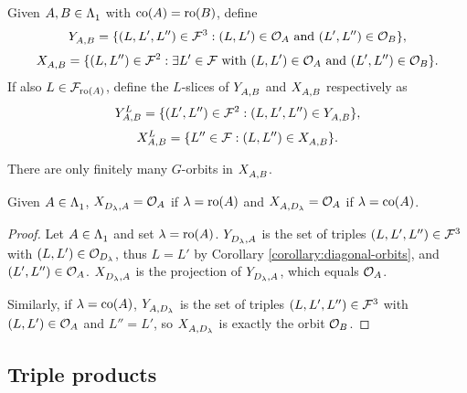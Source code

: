 \documentclass[a4paper, 11pt]{report}
\begin{document}
Given $A,B\in\matrices$ with $\co{A}=\ro{B}$, define
\begin{equation*}
\yprod{A,B} = \{ (L,L',L'')\in\flags^3: (L,L')\in\orbit{A} \text{ and } (L',L'')\in\orbit{B}\},
\end{equation*}
\begin{equation*}
\xprod{A,B} = \{(L,L'')\in\flags^2:\exists L'\in\flags\text{ with } (L,L')\in\orbit{A} \text{ and } (L',L'')\in\orbit{B}\}.
\end{equation*}
If also $L\in\flags_{\ro{A}}$, define the $L$-slices of $\yprod{A,B}$ and $\xprod{A,B}$ respectively as
\begin{equation*}
\yprod[L]{A,B} = \{(L',L'')\in\flags^2: (L,L',L'')\in\yprod{A,B}\},
\end{equation*}
\begin{equation*}
\xprod[L]{A,B} = \{L''\in\flags: (L,L'')\in\xprod{A,B}\}.
\end{equation*}

\begin{observation}
There are only finitely many $G$-orbits in $\xprod{A,B}$.
\end{observation}

\begin{lemma}\label{lemma:product-with-diagonal-orbits}
Given $A\in\matrices$, $\xprod{D_\lambda,A}=\orbit{A}$ if $\lambda=\ro{A}$ and $\xprod{A,D_\lambda}=\orbit{A}$ if $\lambda=\co{A}$.
\end{lemma}

\begin{proof}
Let $A\in\matrices$ and set $\lambda=\ro{A}$. $\yprod{D_\lambda,A}$ is the set of triples $(L,L',L'')\in\flags^3$ with $(L,L')\in\orbit{D_\lambda}$, thus $L=L'$ by Corollary \ref{corollary:diagonal-orbits}, and $(L',L'')\in\orbit{A}$. $\xprod{D_\lambda,A}$ is the projection of $\yprod{D_\lambda,A}$, which equals $\orbit{A}$.

Similarly, if $\lambda=\co{A}$, $\yprod{A,D_\lambda}$ is the set of triples $(L,L',L'')\in\flags^3$ with $(L,L')\in\orbit{A}$ and $L''=L'$, so $\xprod{A,D_\lambda}$ is exactly the orbit $\orbit{B}$.
\end{proof}

\subsection{Triple products}
\end{document}
